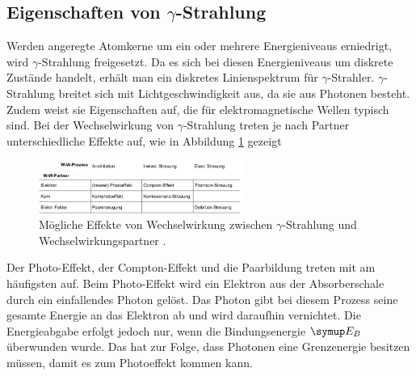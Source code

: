 \subsection{\texorpdfstring{Eigenschaften von $\gamma$}{(Eigenschaften von gamma)}-Strahlung}
Werden angeregte Atomkerne um ein oder mehrere Energieniveaus erniedrigt, wird
$\gamma$-Strahlung freigesetzt. Da es sich bei diesen Energieniveaus um diskrete
Zustände handelt, erhält man ein diskretes Linienspektrum für $\gamma$-Strahler.
$\gamma$-Strahlung breitet sich mit Lichtgeschwindigkeit aus, da sie aus Photonen
besteht. Zudem weist sie Eigenschaften auf, die für elektromagnetische Wellen
typisch sind.
Bei der Wechselwirkung von $\gamma$-Strahlung treten je nach Partner
unterschiedliche Effekte auf, wie in Abbildung \ref{fig:ww} gezeigt
\begin{figure}[H]
  \centering
  \includegraphics[width=0.6\textwidth]{bilder/wechselgamma.jpg}
  \caption{Mögliche Effekte von Wechselwirkung zwischen $\gamma$-Strahlung
  und Wechselwirkungspartner \cite{704}.}
  \label{fig:ww}
\end{figure}
Der Photo-Effekt, der Compton-Effekt und die Paarbildung treten mit am häufigsten
auf.
Beim Photo-Effekt wird ein Elektron aus der Absorberschale durch ein einfallendes
Photon gelöst. Das Photon gibt bei diesem Prozess seine gesamte Energie an das
Elektron ab und wird daraufhin vernichtet. Die Energieabgabe erfolgt jedoch nur,
wenn die Bindungsenergie $\su{E_B}$ überwunden wurde. Das hat zur Folge, dass
Photonen eine Grenzenergie besitzen müssen, damit es zum Photoeffekt kommen kann.

